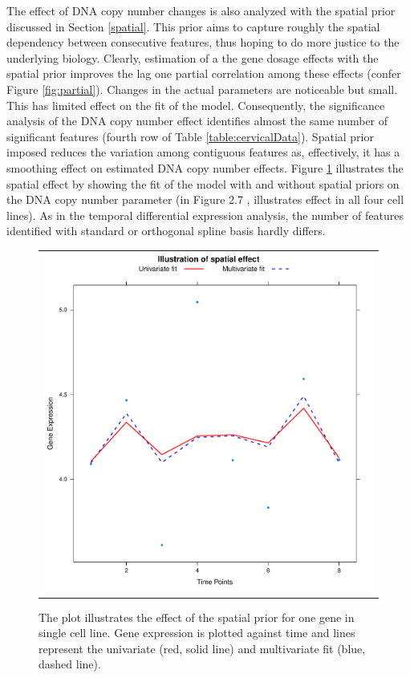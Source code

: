 The effect of DNA copy number changes is also analyzed with the spatial prior discussed in Section \ref{spatial}. This prior aims to capture roughly the spatial dependency between consecutive features, thus hoping to do more justice to the underlying biology. Clearly, estimation of a the gene dosage effects with the spatial prior improves the lag one partial correlation among these effects (confer Figure \ref{fig:partial}). Changes in the actual parameters are noticeable but small. This has limited effect on the fit of the model. Consequently, the significance analysis of the DNA copy number effect identifies almost the same number of significant features (fourth row of Table \ref{table:cervicalData}). Spatial prior imposed reduces the variation among contiguous features as, effectively, it has a smoothing effect on estimated DNA copy number effects. Figure \ref{fig:spatialFit} illustrates the spatial effect by showing the fit of the model with and without spatial priors on the DNA copy number parameter (in Figure 2.7 \cite{Supp2018}, illustrates effect in all four cell lines). As in the temporal differential expression analysis, the number of features identified with standard or orthogonal spline basis hardly differs.

\begin{figure}[h!]
\centering
\begin{tabular}{c}
\includegraphics[scale=0.55]{Figure2.pdf}
\end{tabular}
\caption{The plot illustrates the effect of the spatial prior for one gene in single
 cell line. Gene expression is plotted against time and lines represent the
 univariate (red, solid line) and multivariate fit (blue, dashed line).}
\label{fig:spatialFit}
\end{figure}

